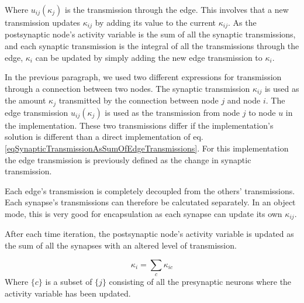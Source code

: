 			Where $u_{ij}(\kappa_j)$ is the transmission through the edge.
			This involves that a new transmission updates $\kappa_{ij}$ by adding its value to the current $\kappa_{ij}$.
			As the postsynaptic node's activity variable is the sum of all the synaptic transmissions, and each synaptic transmission is the integral of all the transmissions through the edge, 
				$\kappa_i$ can be updated by simply adding the new edge transmission to $\kappa_i$.

			In the previous paragraph, we used two 		 different expressions for transmission through a connection between two nodes. 
			The synaptic transmission $\kappa_{ij}$ is used as the amount $\kappa_j$ transmitted by the connection between node $j$ and node $i$. 
			The edge transmission $u_{ij}(\kappa_j)$ is used as the transmission from node $j$ to node $u$ in the implementation. 
			These two transmissions differ if the implementation's solution is different than a direct implementation of eq. \eqref{eqSynapticTransmissionAsSumOfEdgeTransmissions}.
			For this implementation the edge transmission is previously defined as the change in synaptic transmission. 


			Each edge's transmission is completely decoupled from the others' transmissions.
			Each synapse's transmissions can therefore be calcutated separately.
			In an object mode, this is very good for encapsulation as each synapse can update its own $\kappa_{ij}$.

			After each time iteration, the postsynaptic node's activity variable is updated as the sum of all the synapses with an altered level of transmission.

			\begin{equation}
				\kappa_i = \sum_c{\kappa_{ic}}
				\label{eqSynapticTransmissionForKANNimplementation}
			\end{equation}
			Where $\{c\}$ is a subset of $\{j\}$ consisting of all the presynaptic neurons where the activity variable has been updated.

